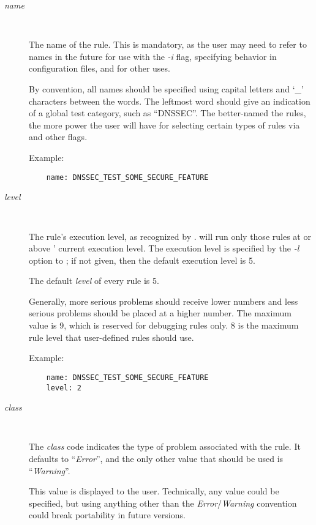 \begin{description}

\item [{\it name}]\verb" "

The name of the rule.  This is mandatory, as the user may need to 
refer to names in the future for use with the {\it -i} flag,
specifying behavior in configuration files, and for other uses.

By convention, all names should be specified using capital letters and
`\_' characters between the words.  The leftmost word should give an
indication of a global test category, such as ``DNSSEC''.  The
better-named the rules, the more power the user will have for
selecting certain types of rules via  and other flags.

Example:

\begin{verbatim}
    name: DNSSEC_TEST_SOME_SECURE_FEATURE
\end{verbatim}

\item [{\it level}]\verb" "

The rule's execution level, as recognized by .   will
run only those rules at or above ' current execution level.
The execution level is specified by the {\it -l} option to
; if not given, then the default execution level is 5.

The default {\it level} of every rule is 5.

Generally, more serious problems should receive lower numbers and
less serious problems should be placed at a higher number.  The
maximum value is 9, which is reserved for debugging rules only.
8 is the maximum rule level that user-defined rules should use.

Example:

\begin{verbatim}
    name: DNSSEC_TEST_SOME_SECURE_FEATURE
    level: 2
\end{verbatim}

\item [{\it class}]\verb" "

The {\it class} code indicates the type of problem associated with the
rule.  It defaults to ``{\it Error}'', and the only other value that should
be used is ``{\it Warning}''.

This value is displayed to the user.  Technically, any value could be
specified, but using anything other than the {\it Error}/{\it Warning}
convention could break portability in future versions.


\end{description}

